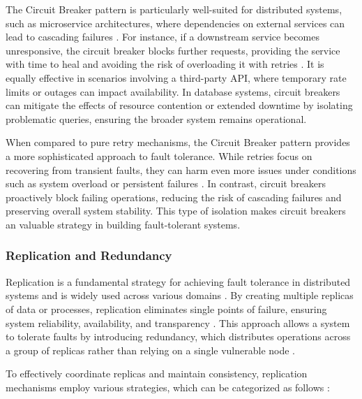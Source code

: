 The Circuit Breaker pattern is particularly well-suited for distributed systems, such as microservice architectures, where dependencies on external services can lead to cascading failures \cite{fowler-circuit-breakers}. For instance, if a downstream service becomes unresponsive, the circuit breaker blocks further requests, providing the service with time to heal and avoiding the risk of overloading it with retries \cite{Vitillo2021}. It is equally effective in scenarios involving a third-party \gls{API}, where temporary rate limits or outages can impact availability. In database systems, circuit breakers can mitigate the effects of resource contention or extended downtime by isolating problematic queries, ensuring the broader system remains operational.

When compared to pure retry mechanisms, the Circuit Breaker pattern provides a more sophisticated approach to fault tolerance. While retries focus on recovering from transient faults, they can harm even more issues under conditions such as system overload or persistent failures \cite{Vitillo2021}. In contrast, circuit breakers proactively block failing operations, reducing the risk of cascading failures and preserving overall system stability. This type of isolation makes circuit breakers an valuable strategy in building fault-tolerant systems.

\subsubsection{Replication and Redundancy}

Replication is a fundamental strategy for achieving fault tolerance in distributed systems and is widely used across various domains \cite{Sari2015}. By creating multiple replicas of data or processes, replication eliminates single points of failure, ensuring system reliability, availability, and transparency \cite{Coulouris2012}. This approach allows a system to tolerate faults by introducing redundancy, which distributes operations across a group of replicas rather than relying on a single vulnerable node \cite{Tanenbaum2023}.

To effectively coordinate replicas and maintain consistency, replication mechanisms employ various strategies, which can be categorized as follows \cite{Isukapalli2024}:

